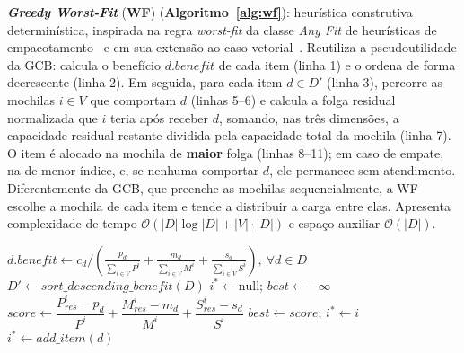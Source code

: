 
\textbf{\textit{Greedy Worst-Fit}} (\textbf{WF}) (\textbf{Algoritmo~\ref{alg:wf}}):
heur\'istica construtiva determin\'istica, inspirada na regra \textit{worst-fit} da classe
\textit{Any Fit} de heur\'isticas de empacotamento~\cite{johnson1974fast,coffman1996approximation}
e em sua extens\~ao ao caso vetorial~\cite{mommessin2025classification}.
Reutiliza a pseudoutilidade da GCB: calcula o benef\'icio $d.\mathit{benefit}$ de cada item (linha 1)
e o ordena de forma decrescente (linha 2). Em seguida, para cada item $d \in D'$ (linha 3),
percorre as mochilas $i \in V$ que comportam $d$ (linhas 5--6) e calcula a folga residual normalizada
que $i$ teria ap\'os receber $d$, somando, nas tr\^es dimens\~oes, a capacidade residual restante dividida
pela capacidade total da mochila (linha 7). O item \'e alocado na mochila de \textbf{maior} folga
(linhas 8--11); em caso de empate, na de menor \'indice, e, se nenhuma comportar $d$, ele permanece
sem atendimento. Diferentemente da GCB, que preenche as mochilas sequencialmente, a WF escolhe a
mochila de cada item e tende a distribuir a carga entre elas. Apresenta complexidade de tempo
$\mathcal{O}(|D| \log |D| + |V| \cdot |D|)$ e espa\c{c}o auxiliar $\mathcal{O}(|D|)$.

\begin{algorithm}[t]
\caption{$\mathit{greedy\_worst\_fit}\ (D, V)$}\label{alg:wf}
\begin{algorithmic}[1]
\State $d.\mathit{benefit} \leftarrow c_d \Big/ \left( \frac{p_d}{\sum_{i \in V} P^i} + \frac{m_d}{\sum_{i \in V} M^i} + \frac{s_d}{\sum_{i \in V} S^i} \right), \ \forall d \in D$
\State $D' \leftarrow \mathit{sort\_descending\_benefit}(D)$
    \State $i^{*} \leftarrow \mathrm{null}$; \quad $\mathit{best} \leftarrow -\infty$
            \State $\mathit{score} \leftarrow \dfrac{P^i_{\mathit{res}} - p_d}{P^i} + \dfrac{M^i_{\mathit{res}} - m_d}{M^i} + \dfrac{S^i_{\mathit{res}} - s_d}{S^i}$
                \State $\mathit{best} \leftarrow \mathit{score}$; \quad $i^{*} \leftarrow i$
            \EndIf
        \EndIf
    \EndFor
        \State $i^{*} \leftarrow \mathit{add\_item}(d)$
    \EndIf
\EndFor
\end{algorithmic}
\end{algorithm}


